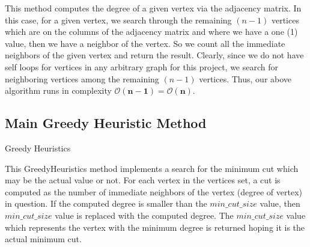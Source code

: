 \documentclass[longpaper, english, final, times]{revdetua}
\begin{document}
			This method computes the degree of a given vertex via the adjacency matrix. In this case, for a given vertex, we search through the remaining $(n-1)$ vertices which are on the columns of the adjacency matrix and where we have a one (1) value, then we have a neighbor of the vertex. So we count all the immediate neighbors of the given vertex and return the result. Clearly, since we do not have self loops for vertices in any arbitrary graph for this project, we search for neighboring vertices among the remaining $(n-1)$ vertices. Thus, our above algorithm runs in complexity $\mathbf{\mathcal{O}(n-1)}=\mathbf{\mathcal{O}(n)}$. 
		
		\subsection{Main Greedy Heuristic Method}
			\begin{algorithm}
				\caption{Greedy Heuristics}
				\label{algotithm:GreedyHeuristics}
				\DontPrintSemicolon
				
				
				
			\end{algorithm}
			
			This GreedyHeuristics method implements a search for the minimum cut which may be the actual value or not. For each vertex in the vertices set, a cut is computed as the number of immediate neighbors of the vertex (degree of vertex) in question. If the computed degree is smaller than the $min\_cut\_size$ value, then $min\_cut\_size$  value is replaced with the computed degree. The $min\_cut\_size$ value which represents the vertex with the minimum degree is returned hoping it is the actual minimum cut. \\
			
\end{document}
